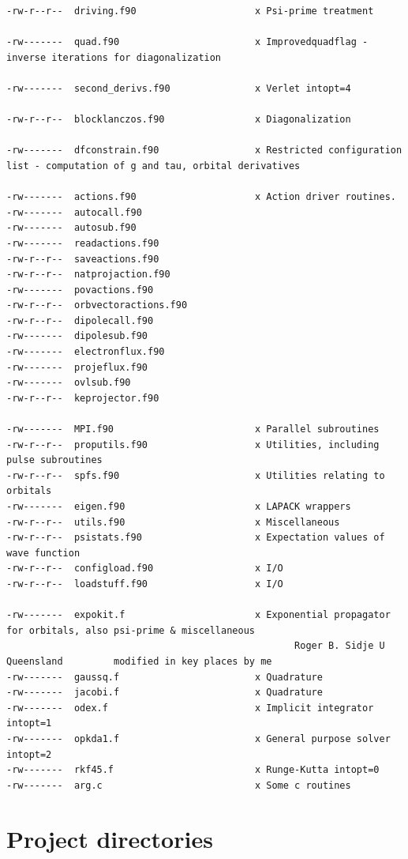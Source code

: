 \documentclass[10pt,leqno, oneside]{book}
\begin{document}
{\begin{verbatim}
-rw-r--r--  driving.f90                     x Psi-prime treatment

-rw-------  quad.f90                        x Improvedquadflag - inverse iterations for diagonalization

-rw-------  second_derivs.f90               x Verlet intopt=4

-rw-r--r--  blocklanczos.f90                x Diagonalization

-rw-------  dfconstrain.f90                 x Restricted configuration list - computation of g and tau, orbital derivatives

-rw-------  actions.f90                     x Action driver routines.
-rw-------  autocall.f90
-rw-------  autosub.f90
-rw-------  readactions.f90
-rw-r--r--  saveactions.f90
-rw-r--r--  natprojaction.f90
-rw-------  povactions.f90
-rw-r--r--  orbvectoractions.f90
-rw-r--r--  dipolecall.f90
-rw-------  dipolesub.f90
-rw-------  electronflux.f90
-rw-------  projeflux.f90
-rw-------  ovlsub.f90
-rw-r--r--  keprojector.f90

-rw-------  MPI.f90                         x Parallel subroutines
-rw-r--r--  proputils.f90                   x Utilities, including pulse subroutines
-rw-r--r--  spfs.f90                        x Utilities relating to orbitals
-rw-------  eigen.f90                       x LAPACK wrappers
-rw-r--r--  utils.f90                       x Miscellaneous
-rw-r--r--  psistats.f90                    x Expectation values of wave function
-rw-r--r--  configload.f90                  x I/O
-rw-r--r--  loadstuff.f90                   x I/O

-rw-------  expokit.f                       x Exponential propagator for orbitals, also psi-prime & miscellaneous 
                                                   Roger B. Sidje U Queensland         modified in key places by me
-rw-------  gaussq.f                        x Quadrature
-rw-------  jacobi.f                        x Quadrature
-rw-------  odex.f                          x Implicit integrator intopt=1
-rw-------  opkda1.f                        x General purpose solver intopt=2
-rw-------  rkf45.f                         x Runge-Kutta intopt=0
-rw-------  arg.c                           x Some c routines
\end{verbatim}
}

\section{Project directories}
\end{document}
